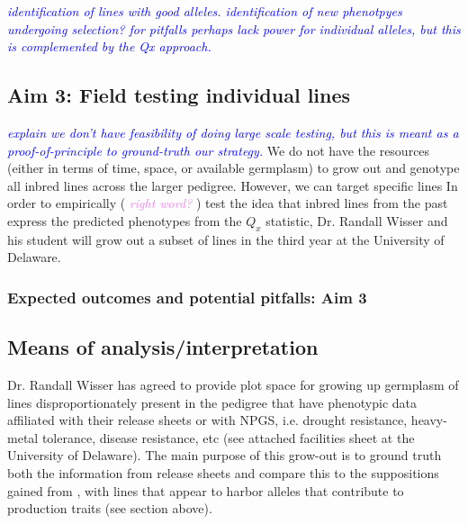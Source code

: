 \documentclass[final,12pt]{article}
\newcommand{\jri}[1]{\textcolor{blue}{ \emph{\scriptsize  #1}} }
\newcommand{\kc}[1]{\textcolor{violet}{ \emph{\scriptsize  #1}} }
\begin{document}
\jri{identification of lines with good alleles. identification of new phenotpyes undergoing selection? for pitfalls perhaps lack power for individual alleles, but this is complemented by the Qx approach.}



\subsection*{Aim 3: Field testing individual lines}
\jri{explain we don't have feasibility of doing large scale testing, but this is meant as a proof-of-principle to ground-truth our strategy. }
We do not have the resources (either in terms of time, space, or available germplasm) to grow out and genotype all inbred lines across the larger pedigree. 
However, we can target specific lines 
In order to empirically (\kc{right word?}) test the idea that inbred lines from the past express the predicted phenotypes from the $Q_{x}$ statistic, Dr. Randall Wisser and his student will grow out a subset of lines in the third year at the University of Delaware.



\subsubsection*{Expected outcomes and potential pitfalls: Aim 3}




\subsection*{Means of analysis/interpretation}
Dr. Randall Wisser has agreed to provide plot space for growing up germplasm of lines disproportionately present in the pedigree that have phenotypic data affiliated with their release sheets or with NPGS, i.e. drought resistance, heavy-metal tolerance, disease resistance, etc (see attached facilities sheet at the University of Delaware). 
The main purpose of this grow-out is to ground truth both the information from release sheets and compare this to the suppositions gained from \citep{Berg:2014bs}, with lines that appear to harbor alleles that contribute to production traits (see section above).
\end{document}
